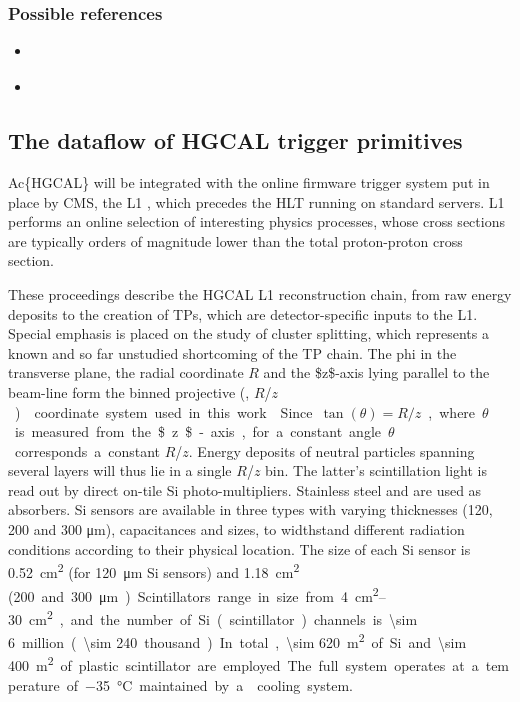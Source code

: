 \documentclass[11pt]{article}
\newcommand{\coordsa}{(\si{\azi}, \si{\rz})}
\newcommand{\rz}{$R$/$z$}
\begin{document}
\subsubsection{Possible references}
\label{sec:org6f2dde8}
\begin{itemize}
\item \cite{cms_offline_computing}
\item \cite{hgcalTDR}
\end{itemize}
\subsection{The dataflow of HGCAL trigger primitives}
\label{sec:org66b00c4}
Ac\{HGCAL\} will be integrated with the online firmware trigger system put in place by \ac{CMS}, the \ac{L1} \cite{l1TDR}, which precedes the \ac{HLT} running on standard servers.
\Ac{L1} performs an online selection of interesting physics processes, whose cross sections are typically orders of magnitude lower than the total proton-proton cross section.



These proceedings describe the \ac{HGCAL} \ac{L1} reconstruction chain, from raw energy deposits to the creation of \acp{TP}, which are detector-specific inputs to the \ac{L1}.
Special emphasis is placed on the study of cluster splitting, which represents a known and so far unstudied shortcoming of the \ac{TP} chain.
The \ac{phi} in the transverse plane, the radial coordinate \(R\) and the \$z\$-axis lying parallel to the beam-line form the binned projective \coordsa{} coordinate system used in this work \cite{cms_collab}.
Since \(\tan(\theta) = R/z\), where \(\theta\) is measured from the \$z\$-axis, for a constant angle \(\theta\) corresponds a constant \rz{}.
Energy deposits of neutral particles spanning several layers will thus lie in a single \rz{} bin.
The latter's scintillation light is read out by direct on-tile \ac{Si} photo-multipliers. Stainless steel and  are used as absorbers.
\ac{Si} sensors are available in three types with varying thicknesses (120, 200 and 300 \si{\micro\meter}), capacitances and sizes, to widthstand different radiation conditions according to their physical location.
The size of each \ac{Si} sensor is \SI{0.52}{\cm\squared} (for \SI{120}{\micro\meter} \ac{Si} sensors) and \SI{1.18}{\cm\squared} (\qty{200} and \SI{300}{\micro\meter}).
Scintillators range in size from \qtyrange{4}{30}{\cm\squared}, and the number of \ac{Si} (scintillator) channels is \num{\sim 6} million (\num{\sim 240} thousand).
In total, \SI{\sim 620}{\meter\squared} of \ac{Si} and \SI{\sim 400}{\meter\squared} of plastic scintillator are employed.
The full system operates at a temperature of \SI{-35}{\celsius} maintained by a  cooling system.
\end{document}
